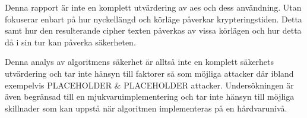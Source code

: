 Denna rapport är inte en komplett utvärdering av \acrshort{aes} och dess användning. Utan fokuserar
enbart på hur nyckellängd och körläge påverkar krypteringstiden. Detta samt hur den resulterande
cipher texten påverkas av vissa körlägen och hur detta då i sin tur kan påverka säkerheten. \par

Denna analys av algoritmens säkerhet är alltså inte en komplett säkerhets utvärdering och tar inte
hänsyn till faktorer så som möjliga attacker där ibland exempelvis PLACEHOLDER \& PLACEHOLDER
attacker. Undersökningen är även begränsad till en mjukvaruimplementering och tar inte hänsyn
till möjliga skillnader som kan uppstå när algoritmen implementeras på en hårdvarunivå.